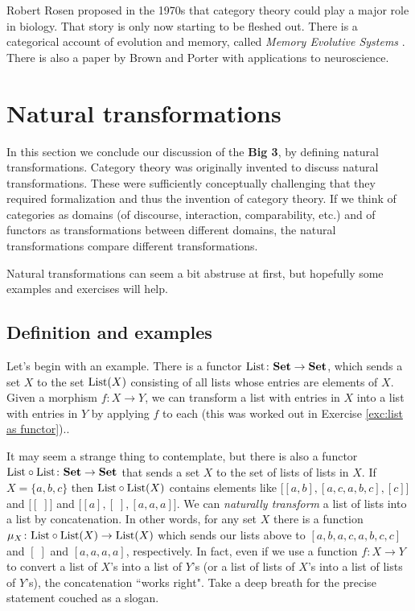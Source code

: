 \documentclass{book}
\def\tn{\textnormal}
\def\List{\tn{List}}
\def\to{\rightarrow}
\def\taking{\colon}
\def\Set{{\bf Set}}
\theoremstyle{remark}
\theoremstyle{definition}
\begin{document}
Robert Rosen proposed in the 1970s that category theory could play a major role in biology. That story is only now starting to be fleshed out. There is a categorical account of evolution and memory, called {\em Memory Evolutive Systems} \cite{EV}. There is also a paper \cite{BP2} by Brown and Porter with applications to neuroscience.


\section{Natural transformations}\label{sec:nat trans}

In this section we conclude our discussion of the {\bf Big 3}, by defining natural transformations. Category theory was originally invented to discuss natural transformations. These were sufficiently conceptually challenging that they required formalization and thus the invention of category theory. If we think of categories as domains (of discourse, interaction, comparability, etc.) and of functors as transformations between different domains, the natural transformations compare different transformations.

Natural transformations can seem a bit abstruse at first, but hopefully some examples and exercises will help.


\subsection{Definition and examples}

Let's begin with an example. There is a functor $\List\taking\Set\to\Set$, which sends a set $X$ to the set $\List(X)$ consisting of all lists whose entries are elements of $X$. Given a morphism $f\taking X\to Y$, we can transform a list with entries in $X$ into a list with entries in $Y$ by applying $f$ to each (this was worked out in Exercise \ref{exc:list as functor}).\index{a functor!$\List\taking\Set\to\Set$}. 

It may seem a strange thing to contemplate, but there is also a functor $\List\circ\List\taking\Set\to\Set$ that sends a set $X$ to the set of lists of lists in $X$. If $X=\{a,b,c\}$ then $\List\circ\List(X)$ contains elements like $\big[[a,b],[a,c,a,b,c],[c]\big]$ and $\big[[\;]\big]$ and $\big[[a],[\;],[a,a,a]\big]$. We can {\em naturally transform} a list of lists into a list by concatenation. In other words, for any set $X$ there is a function $\mu_X\taking\List\circ\List(X)\to\List(X)$ which sends our lists above to $[a,b,a,c,a,b,c,c]$ and $[\;]$ and $[a,a,a,a]$, respectively. In fact, even if we use a function $f\taking X\to Y$ to convert a list of $X$'s into a list of $Y$'s (or a list of lists of $X$'s into a list of lists of $Y$'s), the concatenation ``works right". Take a deep breath for the precise statement couched as a slogan.
\end{document}
